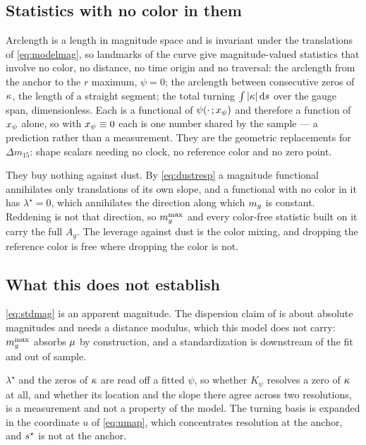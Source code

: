 \documentclass[11pt]{article}
\theoremstyle{plain}
\begin{document}
\subsection{Statistics with no color in them}
\label{sec:shapescalars}

Arclength is a length in magnitude space and is invariant under the translations of
\eqref{eq:modelmag}, so landmarks of the curve give magnitude-valued statistics that
involve no color, no distance, no time origin and no traversal: the arclength from the
anchor to the $r$ maximum, $\psi = 0$; the arclength between consecutive zeros of $\kappa$,
the length of a straight segment; the total turning $\int|\kappa|\,\mathrm{d}s$ over the gauge
span, dimensionless. Each is a functional of $\psi(\cdot\,;x_{\psi})$ and therefore a
function of $x_{\psi}$ alone, so with $x_{\psi} \equiv 0$ each is one number shared by
the sample --- a prediction rather than a measurement. They are the geometric replacements
for $\Delta m_{15}$: shape scalars needing no clock, no reference color and no zero point.

They buy nothing against dust. By \eqref{eq:dustresp} a magnitude functional annihilates
only translations of its own slope, and a functional with no color in it has
$\lambda^{\star} = 0$, which annihilates the direction along which $m_{g}$ is constant.
Reddening is not that direction, so $m_{g}^{\max}$ and every color-free statistic built on it
carry the full $A_{g}$. The leverage against dust is the color mixing, and dropping the
reference color is free where dropping the color is not.

\subsection{What this does not establish}
\label{sec:cmagicgaps}

\eqref{eq:stdmag} is an apparent magnitude. The dispersion claim of \citet{Wang2003} is
about absolute magnitudes and needs a distance modulus, which this model does not carry:
$m_{g}^{\max}$ absorbs $\mu$ by construction, and a standardization is downstream of the fit
and out of sample.

$\lambda^{\star}$ and the zeros of $\kappa$ are read off a fitted $\psi$, so whether
$K_{\psi}$ resolves a zero of $\kappa$ at all, and whether its location and the slope there
agree across two resolutions, is a measurement and not a property of the model. The
turning basis is expanded in the coordinate $u$ of \eqref{eq:umap}, which concentrates
resolution at the anchor, and $s^{\star}$ is not at the anchor.
\end{document}
